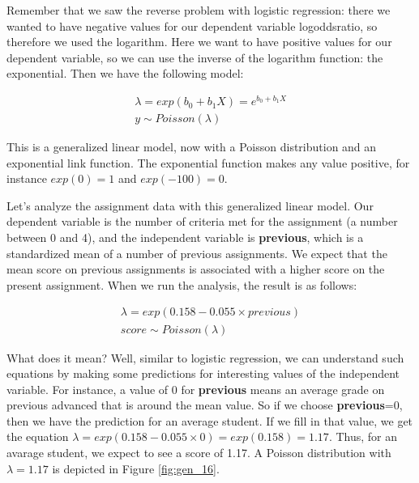 \documentclass[]{book}\usepackage[]{graphicx}\usepackage[]{color}
\begin{document}
Remember that we saw the reverse problem with logistic regression: there we wanted to have negative values for our dependent variable logoddsratio, so therefore we used the logarithm. Here we want to have positive values for our dependent variable, so we can use the inverse of the logarithm function: the exponential. Then we have the following model:


\begin{eqnarray}
\lambda = exp(b_0 + b_1 X)= e^{b_0+b_1X} \\
y \sim Poisson(\lambda)
\end{eqnarray}


This is a generalized linear model, now with a Poisson distribution and an exponential link function. The exponential function makes any value positive, for instance $exp(0)=1$ and $exp(-100)=0$.

Let's analyze the assignment data with this generalized linear model. Our dependent variable is the number of criteria met for the assignment (a number between 0 and 4), and the independent variable is \textbf{previous}, which is a standardized mean of a number of previous assignments. We expect that the mean score on previous assignments is associated with a higher score on the present assignment. When we run the analysis, the result is as follows:


\begin{eqnarray}
\lambda = exp(0.158 -0.055 \times previous) \\
score \sim Poisson(\lambda)
\end{eqnarray}

What does it mean? Well, similar to logistic regression, we can understand such equations by making some predictions for interesting values of the independent variable. For instance, a value of 0 for \textbf{previous} means an average grade on previous advanced that is around the mean value. So if we choose \textbf{previous}=0, then we have the prediction for an average student. If we fill in that value, we get the equation $\lambda=exp(0.158 -0.055 \times 0)= exp (0.158)= 1.17$. Thus, for an avarage student, we expect to see a score of 1.17. A Poisson distribution with $\lambda=1.17$ is depicted in Figure \ref{fig:gen_16}.
\end{document}
